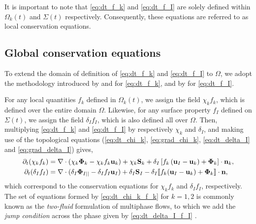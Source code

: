 It is important to note that \ref{eq:dt_f_k} and \ref{eq:dt_f_I} are solely defined within $\Omega_k(t)$ and $\Sigma(t)$ respectively.
Consequently, these equations are referred to as local conservation equations.

\subsection{Global conservation equations}

To extend the domain of definition of \ref{eq:dt_f_k} and \ref{eq:dt_f_I} to $\Omega$, we adopt the methodology introduced by \citet{drew1983mathematical} and \citet{kataoka1986local} for \ref{eq:dt_f_k}, and by \citet[Appendix 2]{marle1982macroscopic} for \ref{eq:dt_f_I}.

For any local quantities $f_k$ defined in $\Omega_k(t)$, we assign the field $\chi_k f_k$, which is defined over the entire domain $\Omega$. 
Likewise, for any surface property $f_I$ defined on $\Sigma(t)$, we assign the field $\delta_I f_I$, which is also defined all over $\Omega$. 
Then, multiplying \ref{eq:dt_f_k} and \ref{eq:dt_f_I} by respectively $\chi_k$ and $\delta_I$, and making use of the topological equations (\ref{eq:dt_chi_k}, \ref{eq:grad_chi_k}, \ref{eq:dt_delta_I} and \ref{eq:grad_delta_I}) gives, 
\begin{align}
    \partial_t (\chi_k f_k)
    &= \mathbf{\nabla} \cdot (\chi_k \mathbf{\Phi}_k - \chi_k f_k \textbf{u}_k)
    + \chi_k \textbf{S}_k
    + \delta_I\left[
        f_k
        \left(
            \textbf{u}_I
            - \textbf{u}_k
        \right)
        + \mathbf{\Phi}_k
    \right]
    \cdot \textbf{n}_k ,
    \label{eq:dt_chi_k_f_k}\\
    \partial_t (\delta_If_I)  
    &= 
    \mathbf{\nabla} \cdot (\delta_I \mathbf{\Phi}_{I||} - \delta_I f_I \textbf{u}_I)
    +\delta_I\textbf{S}_I 
    - \delta_I \llbracket 
    f_k (\textbf{u}_I - \textbf{u}_k)
    + \mathbf{\Phi}_k
     \rrbracket \cdot \textbf{n},
    \label{eq:dt_delta_I_f_I}
\end{align}
which correspond to the conservation equations for $\chi_kf_k$ and $\delta_If_I$, respectively.
The set of equations formed by \ref{eq:dt_chi_k_f_k} for $k =1,2$ is commonly known as the \textit{two-fluid} formulation of multiphase flows, to which we add the \textit{jump condition} across the phase given by \ref{eq:dt_delta_I_f_I} \citep{morel2015mathematical,tryggvason2011direct,drew1983mathematical,kataoka1986local}. 

